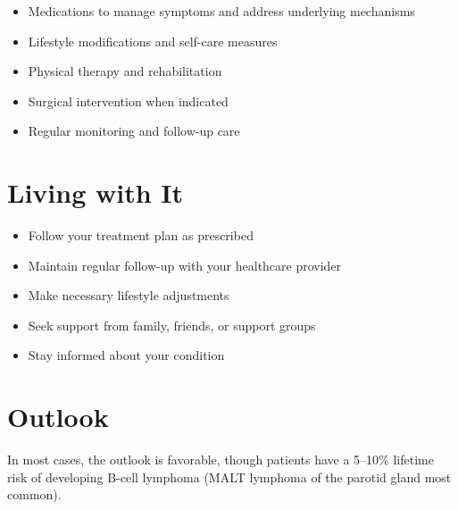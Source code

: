\begin{itemize}[noitemsep]
  \item Medications to manage symptoms and address underlying mechanisms
  \item Lifestyle modifications and self-care measures
  \item Physical therapy and rehabilitation
  \item Surgical intervention when indicated
  \item Regular monitoring and follow-up care
\end{itemize}
\section{Living with It}
\begin{itemize}[noitemsep]
  \item Follow your treatment plan as prescribed
  \item Maintain regular follow-up with your healthcare provider
  \item Make necessary lifestyle adjustments
  \item Seek support from family, friends, or support groups
  \item Stay informed about your condition
\end{itemize}
\section{Outlook}
In most cases, the outlook is favorable, though patients have a 5--10\% lifetime risk of developing B-cell lymphoma (MALT lymphoma of the parotid gland most common).
